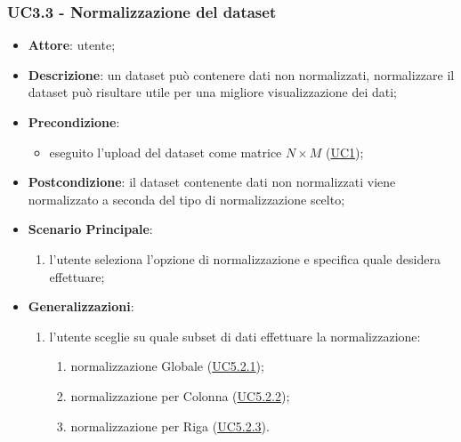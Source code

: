     \subsubsection{UC3.3 - Normalizzazione del dataset}
    \label{uc3.3}
    \begin{itemize}
    \item \textbf{Attore}: utente;
    \item \textbf{Descrizione}: un dataset può contenere dati non normalizzati, normalizzare il dataset può risultare utile per una migliore visualizzazione dei dati;
    \item \textbf{Precondizione}: 
    \begin{itemize}
        \item eseguito l'upload del dataset come matrice $N\times M$ (\hyperref[uc1]{UC1});
    \end{itemize}  
    \item \textbf{Postcondizione}: il dataset contenente dati non normalizzati viene normalizzato a seconda del tipo di normalizzazione scelto;
    \item \textbf{Scenario Principale}:
    \begin{enumerate}
        \item l'utente seleziona l'opzione di normalizzazione e specifica quale desidera effettuare;
    \end{enumerate}  
    \item \textbf{Generalizzazioni}: 
     \begin{enumerate}
            \item l'utente sceglie su quale subset di dati effettuare la normalizzazione:
                \begin{enumerate}
                    \item normalizzazione Globale (\hyperref[uc5.2.1]{UC5.2.1});
                    \item normalizzazione per Colonna (\hyperref[uc5.2.2]{UC5.2.2});
                    \item normalizzazione per Riga (\hyperref[uc5.2.3]{UC5.2.3}).
                \end{enumerate}
        \end{enumerate}  
    \end{itemize}
    
